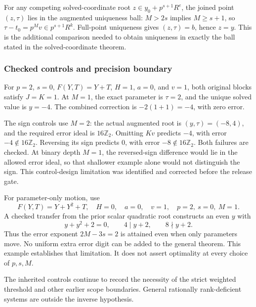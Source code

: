For any competing solved-coordinate root \(z\in y_0+p^{s+1}R^e\), the
joined point \((z,\tau)\) lies in the augmented uniqueness ball:
\(M>2s\) implies \(M\ge s+1\), so \(\tau-t_0=p^Mv\in p^{s+1}R^k\).
Full-point uniqueness gives \((z,\tau)=b\), hence \(z=y\). This is the
additional comparison needed to obtain uniqueness in exactly the ball
stated in the solved-coordinate theorem.

\hypertarget{cont10:checked-controls-and-precision-boundary}{%
\subsubsection{Checked controls and precision
boundary}\label{cont10:checked-controls-and-precision-boundary}}

For \(p=2\), \(s=0\), \(F(Y,T)=Y+T\), \(H=1\), \(a=0\), and \(v=1\),
both original blocks satisfy \(J=K=1\). At \(M=1\), the exact parameter
is \(\tau=2\), and the unique solved value is \(y=-4\). The combined
correction is \(-2(1+1)=-4\), with zero error.

The sign controls use \(M=2\): the actual augmented root is
\((y,\tau)=(-8,4)\), and the required error ideal is \(16\mathbb Z_2\).
Omitting \(Kv\) predicts \(-4\), with error \(-4\notin16\mathbb Z_2\).
Reversing its sign predicts \(0\), with error \(-8\notin16\mathbb Z_2\).
Both failures are checked. At binary depth \(M=1\), the reversed-sign
difference would lie in the allowed error ideal, so that shallower
example alone would not distinguish the sign. This control-design
limitation was identified and corrected before the release gate.

For parameter-only motion, use \[
F(Y,T)=Y+Y^2+T,\quad H=0,\quad a=0,\quad v=1,\quad p=2,\ s=0,\ M=1.
\] A checked transfer from the prior scalar quadratic root constructs an
even \(y\) with \[
y+y^2+2=0,\qquad 4\mid y+2,\qquad 8\nmid y+2.
\] Thus the error exponent \(2M-3s=2\) is attained even when only
parameters move. No uniform extra error digit can be added to the
general theorem. This example establishes that limitation. It does not
assert optimality at every choice of \(p,s,M\).

The inherited controls continue to record the necessity of the strict
weighted threshold and other earlier scope boundaries. General
rationally rank-deficient systems are outside the inverse hypothesis.

